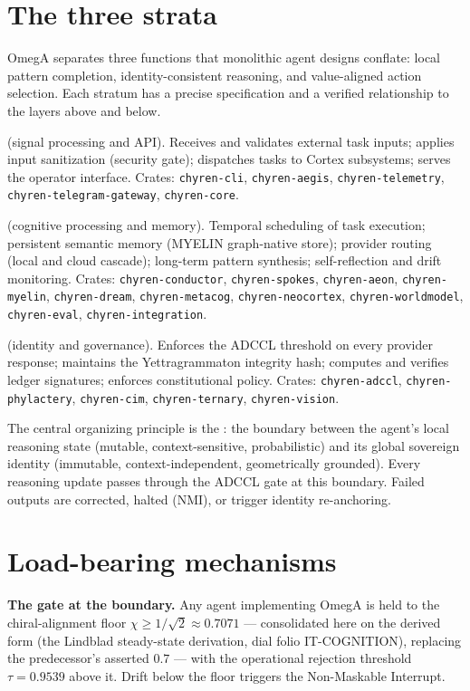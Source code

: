 \documentclass{alienfolio}
\begin{document}
\section{The three strata}
OmegA separates three functions that monolithic agent designs conflate:
local pattern completion, identity-consistent reasoning, and value-aligned
action selection. Each stratum has a precise specification and a verified
relationship to the layers above and below.

 (signal processing and API). Receives and validates
external task inputs; applies input sanitization (security gate); dispatches
tasks to Cortex subsystems; serves the operator interface. {\small Crates:
\texttt{chyren-cli}, \allowbreak \texttt{chyren-aegis}, \allowbreak \texttt{chyren-telemetry},
\allowbreak \texttt{chyren-telegram-gateway}, \allowbreak \texttt{chyren-core}.}

 (cognitive processing and memory). Temporal
scheduling of task execution; persistent semantic memory (MYELIN graph-native
store); provider routing (local and cloud cascade); long-term pattern
synthesis; self-reflection and drift monitoring. {\small Crates:
\texttt{chyren-conductor}, \allowbreak \texttt{chyren-spokes}, \allowbreak \texttt{chyren-aeon},
\allowbreak \texttt{chyren-myelin}, \allowbreak \texttt{chyren-dream}, \allowbreak \texttt{chyren-metacog},
\allowbreak \texttt{chyren-neocortex}, \allowbreak \texttt{chyren-worldmodel}, \allowbreak \texttt{chyren-eval},
\allowbreak \texttt{chyren-integration}.}

 (identity and governance). Enforces the
ADCCL threshold on every provider response; maintains the Yettragrammaton
integrity hash; computes and verifies ledger signatures; enforces
constitutional policy. Crates: \texttt{chyren-adccl},
\texttt{chyren-phylactery}, \texttt{chyren-cim}, \texttt{chyren-ternary},
\texttt{chyren-vision}.

The central organizing principle is the : the boundary
between the agent's local reasoning state (mutable, context-sensitive,
probabilistic) and its global sovereign identity (immutable,
context-independent, geometrically grounded). Every reasoning update passes
through the ADCCL gate at this boundary. Failed outputs are corrected, halted
(NMI), or trigger identity re-anchoring.

\section{Load-bearing mechanisms}
\textbf{The gate at the boundary.} Any agent implementing OmegA is held to
the chiral-alignment floor $\chi \geq 1/\sqrt{2} \approx 0.7071$ ---
consolidated here on the derived form (the Lindblad steady-state derivation,
dial folio IT-COGNITION), replacing the predecessor's asserted $0.7$ ---
with the operational rejection threshold $\tau = 0.9539$ above it. Drift
below the floor triggers the Non-Maskable Interrupt.
\end{document}
